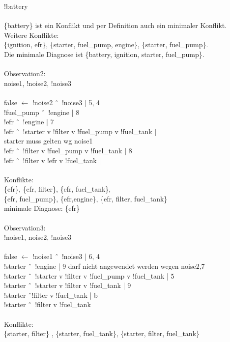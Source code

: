 \documentclass[DIV=12,numbers=noenddot]{scrartcl}
\begin{document}
	!battery\\\\
	\{battery\} ist ein Konflikt und per Definition auch ein minimaler Konflikt.\\
	Weitere Konflikte:\\ \{ignition, efr\}, \{starter, fuel\_pump, engine\}, \{starter, fuel\_pump\}.\\
	Die minimale Diagnose ist \{battery, ignition, starter, fuel\_pump\}.\\\\
	Observation2:\\
	noise1, !noise2, !noise3\\\\
	false $\leftarrow$ !noise2 \^\ \ !noise3	| 5, 4\\
	!fuel\_pump \^\ \ !engine		| 8\\
	!efr \^\ \ !engine			| 7\\
	!efr \^\ \ !starter v !filter v !fuel\_pump v !fuel\_tank |\\ starter muss gelten wg noise1\\
	!efr \^\ \  !filter v !fuel\_pump v !fuel\_tank	| 8\\
	!efr \^\ \ !filter v !efr v !fuel\_tank		|\\\\
	Konflikte:\\  \{efr\}, \{efr, filter\}, \{efr, fuel\_tank\},\\ \{efr, fuel\_pump\}, \{efr,engine\}, \{efr, filter, fuel\_tank\}\\
	minimale Diagnose: \{efr\}\\\\
	Observation3:\\
	!noise1, noise2, !noise3\\\\
	false $\leftarrow$ !noise1 \^\ \ !noise3	| 6, 4\\
	!starter \^\ \ !engine		| 9 darf nicht angewendet werden wegen noise2,7\\
	!starter \^\ \ !starter v !filter v !fuel\_pump v !fuel\_tank	| 5\\
	!starter \^\ \ !starter v !filter v !fuel\_tank	| 9\\
	!starter \^\ !filter v !fuel\_tank 	| b\\
	!starter \^\ \ !filter v !fuel\_tank\\\\
	Konflikte:\\ \{starter, filter\} , \{starter, fuel\_tank\}, \{starter,  filter, fuel\_tank\}\\\\
\end{document}
